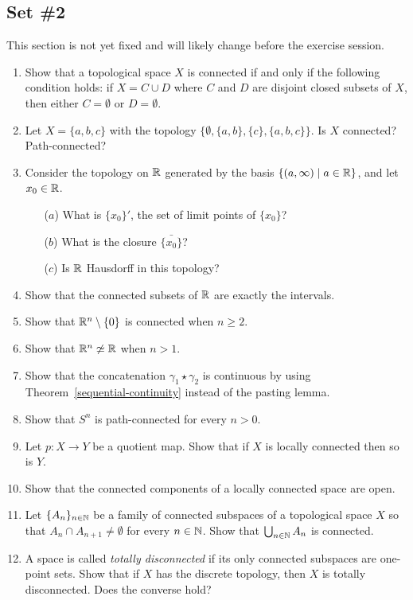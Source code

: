 \subsection{Set \#2}
This section is not yet fixed and will likely change before the exercise session.
\begin{enumerate}
  \item Show that a topological space $X$ is connected if and only if the following condition holds: if $X = C \cup D$ where $C$ and $D$ are disjoint closed subsets of $X$, then either $C = \emptyset$ or $D = \emptyset$.
  \item Let $X = \{a,b,c\}$ with the topology $\{\emptyset,\{a,b\},\{c\},\{a,b,c\}\}$. Is $X$ connected? Path-connected?
  \item Consider the topology on $\mathbb{R}$ generated by the basis $\{(a,\infty) \mid a \in \mathbb{R} \}$, and let $x_0 \in \mathbb{R}$. \begin{itemize}
    \item[($a$)] What is $\{x_0\}'$, the set of limit points of $\{x_0\}$?
    \item[($b$)] What is the closure $\bar{\{x_0\}}$?
    \item[($c$)] Is $\mathbb{R}$ Hausdorff in this topology?
  \end{itemize}
  \item \label{connected-implies-interval} Show that the connected subsets of $\mathbb{R}$ are exactly the intervals.
  \item \label{origin-removed-connected} Show that $\mathbb{R}^n \setminus \{0\}$ is connected when $n \geq 2$.
  \item Show that $\mathbb{R}^n \not\simeq \mathbb{R}$ when $n > 1$.
  \item Show that the concatenation $\gamma_1 \star \gamma_2$ is continuous by using Theorem~\ref{sequential-continuity} instead of the pasting lemma.
  \item Show that $S^n$ is path-connected for every $n > 0$.
  \item Let $p : X \to Y$ be a quotient map. Show that if $X$ is locally connected then so is $Y$.
  \item \label{locally-connected-open} Show that the connected components of a locally connected space are open.
  \item Let $\{A_n\}_{n \in \mathbb{N}}$ be a family of connected subspaces of a topological space $X$ so that $A_n \cap A_{n+1} \not= \emptyset$ for every $n \in \mathbb{N}$. Show that $\bigcup_{n \in \mathbb{N}} A_n$ is connected.
  \item A space is called \emph{totally disconnected} if its only connected subspaces are one-point sets. Show that if $X$ has the discrete topology, then $X$ is totally disconnected. Does the converse hold?

\end{enumerate}
